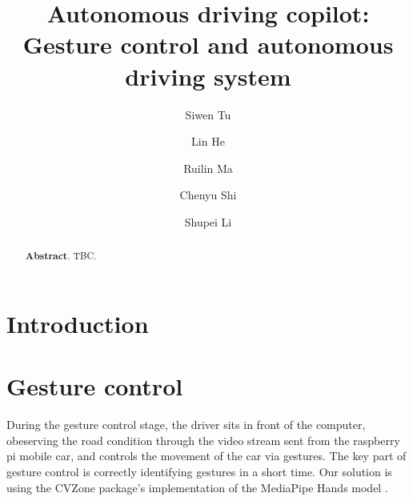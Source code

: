 \documentclass[acmsmall]{acmart}
\begin{document}
\title{Autonomous driving copilot: Gesture control and autonomous driving system}

\author{Siwen Tu}
\author{Lin He}
\author{Ruilin Ma}
\author{Chenyu Shi}
\author{Shupei Li}


\renewcommand{\shortauthors}{S. Tu, L. He, R. Ma, C. Shi and S. Li}

\begin{abstract}
    \textbf{Abstract}. TBC.
\end{abstract}



\maketitle

\section{Introduction}

\section{Gesture control}
During the gesture control stage, the driver sits in front of the computer, obeserving the road condition through the video stream sent from the raspberry pi mobile car, and controls the movement of the car via gestures. The key part of gesture control is correctly identifying gestures in a short time. Our solution is using the CVZone package's implementation of the MediaPipe Hands model \cite{cvzone}.
\end{document}
